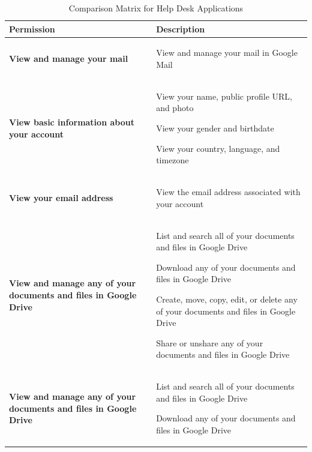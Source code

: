 \begin{table}[H]
\begin{center}
	\renewcommand{\arraystretch}{1}
	\caption[Comparison Matrix for Help Desk Applications]{Comparison Matrix for Help Desk Applications} \label{tab:comp_matr_help}
    \begin{tabular}{ | p{5cm} | p{8cm} | }
	\hline
	\textbf{Permission} & \textbf{Description} \\ \hline
	\textbf{View and manage your mail} & 
	\begin{compactitem}
		\item View and manage your mail in Google Mail
	\end{compactitem} \\ \hline
	\textbf{View basic information about your account} &
	\begin{compactitem}
		\item View your name, public profile URL, and photo
		\item View your gender and birthdate
		\item View your country, language, and timezone
	\end{compactitem} \\ \hline
	\textbf{View your email address} &
	\begin{compactitem}
		\item View the email address associated with your account
	\end{compactitem} \\ \hline
	\textbf{View and manage any of your documents and files in Google Drive} &
	\begin{compactitem}
		\item List and search all of your documents and files in Google Drive
		\item Download any of your documents and files in Google Drive
		\item Create, move, copy, edit, or delete any of your documents and files in Google Drive
		\item Share or unshare any of your documents and files in Google Drive
	\end{compactitem} \\ \hline
	\textbf{View and manage any of your documents and files in Google Drive} &
	\begin{compactitem}
		\item List and search all of your documents and files in Google Drive
		\item Download any of your documents and files in Google Drive

\end{compactitem}
\end{tabular}
\end{center}
\end{table}
